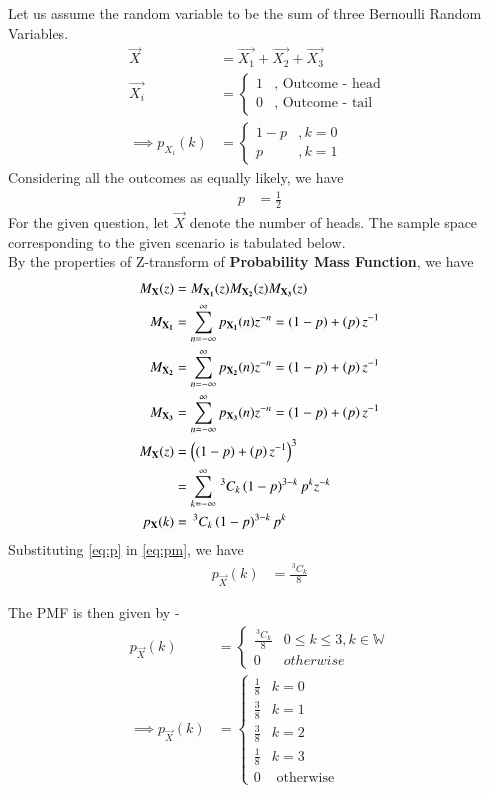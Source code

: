 \documentclass[journal]{IEEEtran}
\newcommand{\nCr}[2]{\,^{#1}C_{#2}}
\begin{document}

Let us assume the random variable to be the sum of three Bernoulli Random Variables.
\begin{align}
	\vec{X} &= \vec{X_{1}} + \vec{X_{2}} + \vec{X_{3}} \\
	\vec{X_{i}} &= 
	\begin{cases}
		1 & , \text{ Outcome - head } \\
		0 & , \text{ Outcome - tail }
	\end{cases} \\
	\implies p_{X_{i}} (k) &= 
	\begin{cases}
		1 - p & , k = 0 \\
		p & , k = 1
	\end{cases}
\end{align}
Considering all the outcomes as equally likely, we have
\begin{align}
	p &= \frac{1}{2} \label{eq:p}
\end{align}
For the given question, let $\vec{X}$ denote the number of heads. The sample space corresponding to the given scenario is tabulated below. \\

By the properties of Z-transform of \textbf{Probability Mass Function}, we have
\begin{align}
	M_{\vec{X}} (z) &= M_{\vec{X_{1}}} (z) M_{\vec{X_{2}}} (z) M_{\vec{X_{3}}} (z) \\
	M_{\vec{X_{1}}} &= \sum_{n = - \infty}^{\infty} p_{\vec{X_{1}}} (n) z^{-n} = (1 - p) + \brak{p}z^{-1} \\
	M_{\vec{X_{2}}} &= \sum_{n = - \infty}^{\infty} p_{\vec{X_{2}}} (n) z^{-n} = (1 - p) + \brak{p}z^{-1} \\
	M_{\vec{X_{3}}} &= \sum_{n = - \infty}^{\infty} p_{\vec{X_{3}}} (n) z^{-n} = (1 - p) + \brak{p}z^{-1} \\
	M_{\vec{X}} (z) &= \brak{(1 - p) + \brak{p}z^{-1}}^3 \\
	                &= \sum_{k = -\infty}^{\infty} \nCr{3}{k} \brak{1-p}^{3-k} p^{k} z^{-k} \\
	p_{\vec{X}} (k) &= \nCr{3}{k} \brak{1-p}^{3-k} p^{k} \label{eq:pm}
\end{align}
Substituting \eqref{eq:p} in \eqref{eq:pm}, we have
\begin{align}
	p_{\vec{X}} (k) &= \frac{\nCr{3}{k}}{8} \label{eq:pmf}
\end{align}

The PMF is then given by - 
\begin{align}
p_{\vec{X}} (k) &= 
\begin{cases}
	\frac{\nCr{3}{k}}{8} & 0 \leq k \leq 3, k \in \mathbb{W} \\
	0 & otherwise
\end{cases} \\
\implies p_{\vec{X}} (k) &= 
\begin{cases}
	\frac{1}{8} & k = 0 \\
	\frac{3}{8} & k = 1 \\
	\frac{3}{8} & k = 2 \\
	\frac{1}{8} & k = 3 \\
	0 & \text{ otherwise }
\end{cases}
\end{align}
\end{document}

